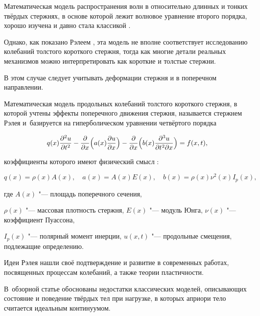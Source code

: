 Математическая модель распространения волн в относительно длинных и тонких  твёрдых стержнях, в основе которой лежит волновое уравнение второго порядка, хорошо изучена и давно стала классикой \cite{T-S}. 

Однако, как показано Рэлеем \cite[с.~273, 274]{Re}, эта модель не вполне соответствует  исследованию колебаний толстого короткого стержня, тогда как многие детали реальных механизмов можно интерпретировать  как короткие  и толстые стержни.

В этом случае следует учитывать деформации стержня и в поперечном направлении. 

Математическая модель продольных колебаний толстого короткого стержня, в которой учтены эффекты поперечного движения стержня, называется стержнем  Рэлея и~базируется на гиперболическом уравнении четвёртого порядка  \cite[pp.~158--184]{Rao} 

  \begin{equation}

 \label{bey1}

q(x)\frac{\partial^2u}{\partial t^2}- \frac{\partial}{\partial x}

\Bigl(a(x)\frac{\partial u}{\partial x}\Bigr)-

\frac{\partial}{\partial x}

\Bigl(b(x)\frac{\partial^3u}

{\partial t^2\partial x}\Bigr)=f(x,t),

\end{equation}

коэффициенты которого имеют физический смысл \cite{FPS}:

$$q(x)=\rho(x)A(x), \quad a(x)=A(x)E(x), \quad  b(x)=\rho(x)\nu^2(x)I_p(x),$$

где  $A(x)$ "--- площадь поперечного сечения,

$\rho(x)$ "--- массовая плотность стержня, $E(x)$ "--- модуль Юнга, $\nu(x)$ "--- коэффициент Пуассона,

$I_p(x)$ "--- полярный момент инерции, $u(x,t)$ "--- продольные смещения, подлежащие  определению.



Идеи Рэлея нашли своё подтверждение и развитие в современных работах, посвященных процессам колебаний, а также теории пластичности. 

В~обзорной статье  \cite{Baz} обоснованы недостатки классических моделей, описывающих состояние и поведение твёрдых тел при нагрузке, в которых априори тело считается идеальным континуумом. 


